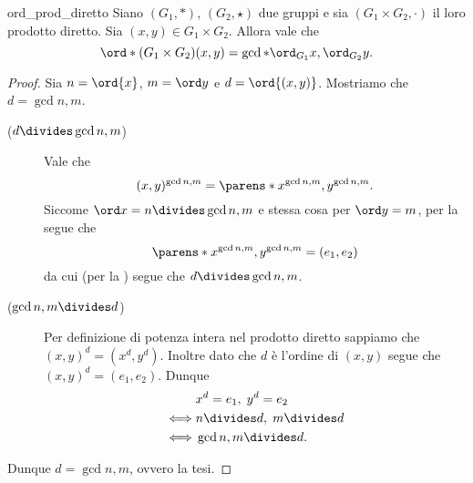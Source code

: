 \begin{proposition}
    {ord_prod_diretto}
    Siano $(G_1, *)$, $(G_2, \star)$ due gruppi e sia $(G_1 \times G_2, \cdot)$ il loro prodotto diretto. Sia $(x, y) \in G_1 \times G_2$. Allora vale che \[
        \ord*(G_1 \times G_2){(x, y)} = \gcd*{\ord_{G_1}{x}, \ord_{G_2}{y}}.    
    \]
\end{proposition}
\begin{proof}
    Sia $n = \ord{x}$, $m = \ord y$ e $d = \ord{(x, y)}$. Mostriamo che $d = \gcd{n, m}$.
    \begin{description}
        \item[($d \divides \gcd{n, m}$)] Vale che \[
            (x, y)^{\gcd{n, m}} = \parens*{x^{\gcd{n, m}}, y^{\gcd{n, m}}}.   
        \] Siccome $\ord x = n \divides \gcd{n, m}$ e stessa cosa per $\ord y = m$, per la  segue che \begin{equation*}
            \parens*{x^{\gcd{n, m}}, y^{\gcd{n, m}}} = (e_1, e_2)
        \end{equation*}
        da cui (per la ) segue che $d \divides \gcd{n, m}$.
        \item[($\gcd{n, m} \divides d$)] Per definizione di potenza intera nel prodotto diretto sappiamo che $(x, y)^d = (x^d, y^d)$. Inoltre dato che $d$ è l'ordine di $(x, y)$ segue che $(x, y)^d = (e_1, e_2)$. Dunque \begin{align*}
            &x^d = e_1, \; y^d = e_2\\
            \iff &n \divides d, \; m \divides d \\
            \iff &\gcd{n, m} \divides d.
        \end{align*}
    \end{description}
    Dunque $d = \gcd{n, m}$, ovvero la tesi.
\end{proof}

